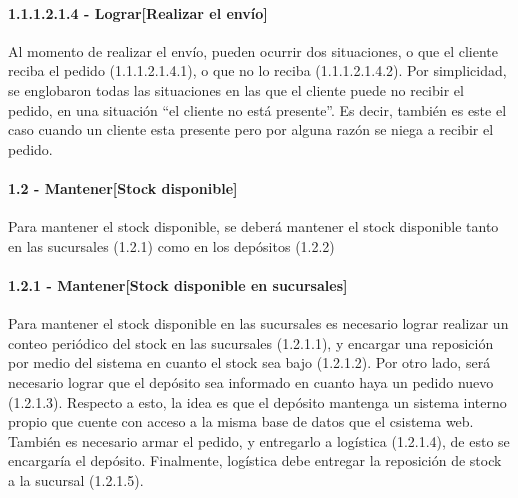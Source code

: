 \paragraph{1.1.1.2.1.4 - Lograr[Realizar el envío]} \label{para:1.1.1.2.1.4}

Al momento de realizar el envío, pueden ocurrir dos situaciones, o que el
cliente reciba el pedido (1.1.1.2.1.4.1), o que no lo reciba (1.1.1.2.1.4.2).
Por simplicidad, se englobaron todas las situaciones en las que el cliente puede
no recibir el pedido, en una situación ``el cliente no está presente''. Es
decir, también es este el caso cuando un cliente esta presente pero por alguna
razón se niega a recibir el pedido.



\clearpage
\paragraph{1.2 - Mantener[Stock disponible]} \label{para:1.2}

Para mantener el stock disponible, se deberá mantener el stock disponible tanto
en las sucursales (1.2.1) como en los depósitos (1.2.2)

\paragraph{1.2.1 - Mantener[Stock disponible en sucursales]} \label{para:1.2.1}

Para mantener el stock disponible en las sucursales es necesario lograr realizar
un conteo periódico del stock en las sucursales (1.2.1.1), y encargar una
reposición por medio del sistema en cuanto el stock sea bajo (1.2.1.2). Por otro
lado, será necesario lograr que el depósito sea informado en cuanto haya un
pedido nuevo (1.2.1.3). Respecto a esto, la idea es que el depósito mantenga un
sistema interno propio que cuente con acceso a la misma base de datos que el
csistema web. También es necesario armar el pedido, y entregarlo a logística
(1.2.1.4), de esto se encargaría el depósito. Finalmente, logística debe
entregar la reposición de stock a la sucursal (1.2.1.5).

